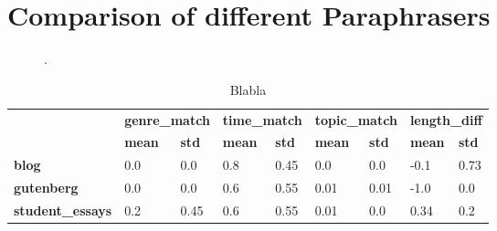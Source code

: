 \section{Comparison of different Paraphrasers}

\begin{figure}[htbp]
    \centering
    
    \caption{.}
    \label{fig:extraction_eval}
\end{figure}

\begin{table}[]
\centering
\caption{Blabla}
\label{tab:extraction_eval_stats}
\begin{tabular}{lllllllll}
\toprule
 &
  \multicolumn{2}{l}{\textbf{genre\_match}} &
  \multicolumn{2}{l}{\textbf{time\_match}} &
  \multicolumn{2}{l}{\textbf{topic\_match}} &
  \multicolumn{2}{l}{\textbf{length\_diff}} \\
 &
  \textbf{mean} &
  \textbf{std} &
  \textbf{mean} &
  \textbf{std} &
  \textbf{mean} &
  \textbf{std} &
  \textbf{mean} &
  \textbf{std} \\
  \midrule
\textbf{blog}            & 0.0 & 0.0  & 0.8 & 0.45 & 0.0  & 0.0  & -0.1 & 0.73 \\
\textbf{gutenberg}       & 0.0 & 0.0  & 0.6 & 0.55 & 0.01 & 0.01 & -1.0 & 0.0  \\
\textbf{student\_essays} & 0.2 & 0.45 & 0.6 & 0.55 & 0.01 & 0.0  & 0.34 & 0.2 \\
  \bottomrule
\end{tabular}%
\end{table}